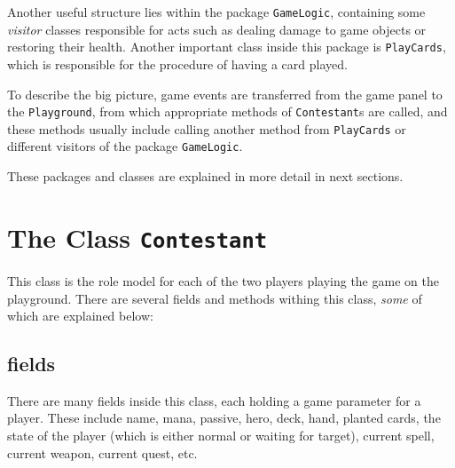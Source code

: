 \documentclass[a4paper]{article}
\begin{document}
Another useful structure lies within the package \texttt{GameLogic}, containing some \textit{visitor} classes responsible for acts such as dealing damage to game objects or restoring their health. Another important class inside this package is \texttt{PlayCards}, which is responsible for the procedure of having a card played.

To describe the big picture, game events are transferred from the game panel to the \texttt{Playground}, from which appropriate methods of \texttt{Contestant}s are called, and these methods usually include calling another method from \texttt{PlayCards} or different visitors of the package \texttt{GameLogic}.

These packages and classes are explained in more detail in next sections.

\clearpage
\section{The Class \texttt{Contestant}}
This class is the role model for each of the two players playing the game on the playground. There are several fields and methods withing this class, \textit{some} of which are explained below:
\subsection{fields}
There are many fields inside this class, each holding a game parameter for a player. These include name, mana, passive, hero, deck, hand, planted cards, the state of the player (which is either normal or waiting for target), current spell, current weapon, current quest, etc.
\end{document}

